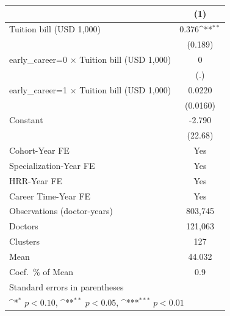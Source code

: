 {
\def\sym#1{\ifmmode^{#1}\else\(^{#1}\)\fi}
\begin{tabular}{l*{1}{c}}
\hline\hline
                    &\multicolumn{1}{c}{(1)}         \\
\hline
Tuition bill (USD 1,000)&       0.376\sym{**} \\
                    &     (0.189)         \\
[1em]
early\_career=0 $\times$ Tuition bill (USD 1,000)&           0         \\
                    &         (.)         \\
[1em]
early\_career=1 $\times$ Tuition bill (USD 1,000)&      0.0220         \\
                    &    (0.0160)         \\
[1em]
Constant            &      -2.790         \\
                    &     (22.68)         \\
[1em]
Cohort-Year FE      &         Yes         \\
[1em]
Specialization-Year FE&         Yes         \\
[1em]
HRR-Year FE         &         Yes         \\
[1em]
Career Time-Year FE &         Yes         \\
\hline
Observations (doctor-years)&     803,745         \\
Doctors             &     121,063         \\
Clusters            &         127         \\
Mean                &      44.032         \\
Coef.\ \% of Mean   &         0.9         \\
\hline\hline
\multicolumn{2}{l}{\footnotesize Standard errors in parentheses}\\
\multicolumn{2}{l}{\footnotesize \sym{*} \(p<0.10\), \sym{**} \(p<0.05\), \sym{***} \(p<0.01\)}\\
\end{tabular}
}
